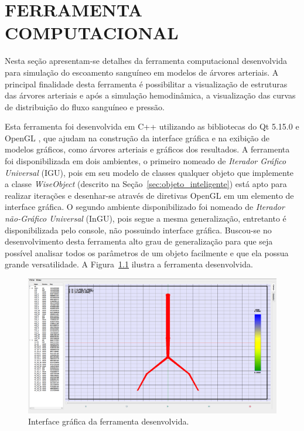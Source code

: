\chapter{FERRAMENTA COMPUTACIONAL}\label{sec:ferramenta_computacional}

Nesta seção apresentam-se detalhes da ferramenta computacional desenvolvida para simulação do escoamento sanguíneo em modelos de árvores arteriais. A principal finalidade desta ferramenta é possibilitar a visualização de estruturas das árvores arteriais e após a simulação hemodinâmica,  a visualização das curvas de distribuição do fluxo sanguíneo e pressão.

Esta ferramenta foi desenvolvida em C++ utilizando as bibliotecas do Qt 5.15.0 \cite{QTClasses} e OpenGL \cite{OpenGL}, que ajudam na construção da interface gráfica e na exibição de modelos gráficos, como árvores arteriais e gráficos dos resultados. A ferramenta foi disponibilizada em dois ambientes, o primeiro nomeado de \textit{Iterador Gráfico Universal} (IGU), pois em seu modelo de classes qualquer objeto que implemente a classe \textit{WiseObject} (descrito na Seção~\ref{sec:objeto_inteligente}) está apto para realizar iterações e desenhar-se através de diretivas OpenGL em um elemento de interface gráfica. O segundo ambiente disponibilizado foi nomeado de \textit{Iterador não-Gráfico Universal} (InGU), pois segue a mesma generalização, entretanto é disponibilizada pelo console, não possuindo interface gráfica. Buscou-se no desenvolvimento desta ferramenta alto grau de generalização para que seja possível analisar todos os parâmetros de um objeto facilmente e que ela possua grande versatilidade.  A Figura~\ref{fig1:gui} ilustra a ferramenta desenvolvida.

\begin{figure}[!htbp]
	\centering
	\includegraphics[scale=0.25]{Figures/IGU_002.png}
	\caption{Interface gráfica da ferramenta desenvolvida.}
	\label{fig1:gui}
\end{figure}

